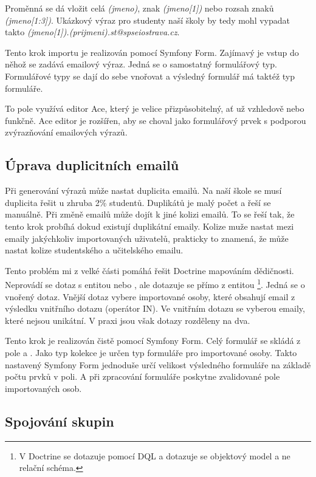 Proměnná se dá vložit celá \textit{(jmeno)}, znak \textit{(jmeno[1])} nebo rozsah znaků \textit{(jmeno[1:3])}.
Ukázkový výraz pro studenty naší školy by tedy mohl vypadat takto \textit{(jmeno[1]).(prijmeni).st@spseiostrava.cz}.

Tento krok importu je realizován pomocí Symfony Form.
Zajímavý je vstup do něhož se zadává emailový výraz.
Jedná se o samostatný formulářový typ. 
Formulářové typy se dají do sebe vnořovat a výsledný formulář má taktéž typ formuláře. 

To pole využívá editor Ace, který je velice přizpůsobitelný, ať už vzhledově nebo funkčně.
Ace editor je rozšířen, aby se choval jako formulářový prvek s podporou zvýrazňování emailových výrazů.

\subsection{Úprava duplicitních emailů}\label{postup:deduplikace-emailu}

Při generování výrazů může nastat duplicita emailů.
Na naší škole se musí duplicita řešit u zhruba 2\% studentů.
Duplikátů je malý počet a řeší se manuálně.
Při změně emailů může dojít k jiné kolizi emailů.
To se řeší tak, že tento krok probíhá dokud existují duplikátní emaily.
Kolize muže nastat mezi emaily jakýchkoliv importovaných uživatelů,
prakticky to znamená, že může nastat kolize studentského a učitelského emailu.

Tento problém mi z velké části pomáhá řešit Doctrine mapováním dědičnosti.
Neprovádí se dotaz s entitou  nebo , ale dotazuje se přímo z entitou \footnote{V Doctrine se dotazuje pomocí DQL a dotazuje se objektový model a ne relační schéma.}.
Jedná se o vnořený dotaz.
Vnější dotaz vybere importované osoby, které obsahují email z výsledku vnitřního dotazu (operátor \textsc{IN}).
Ve vnitřním dotazu se vyberou emaily, které nejsou unikátní. V praxi jsou však dotazy rozděleny na dva.

Tento krok je realizován čistě pomocí Symfony Form. Celý formulář se skládá z pole  a .
Jako typ kolekce je určen typ formuláře pro importované osoby.
Takto nastavený Symfony Form jednoduše určí velikost výsledného formuláře na základě počtu prvků v poli.
A při zpracování formuláře poskytne zvalidované pole importovaných osob.

\subsection{Spojování skupin}\label{postup:spojovani-skupin}


